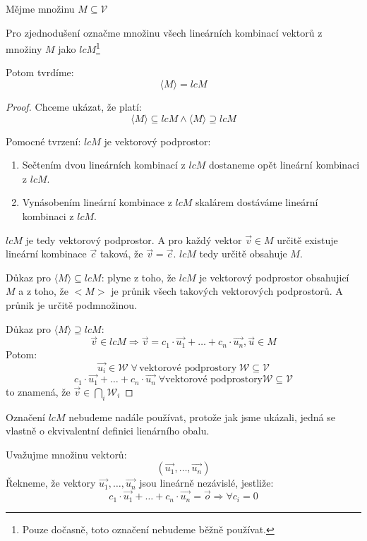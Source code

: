 \begin{theorem}
    Mějme množinu $M \subseteq \mathcal{V}$

    Pro zjednodušení označme množinu všech lineárních kombinací
    vektorů z množiny $M$ jako $lcM$\footnote{Pouze dočasně, toto
    označení nebudeme běžně používat.}

    Potom tvrdíme:
    $$\langle M \rangle = lcM$$
\end{theorem}
\begin{proof}
    Chceme ukázat, že platí:
    $$\langle M \rangle \subseteq lcM \wedge \langle M \rangle \supseteq lcM$$

    Pomocné tvrzení: $lcM$ je vektorový podprostor:
    \begin{enumerate}
        \item Sečtením dvou lineárních kombinací z $lcM$ dostaneme opět lineární kombinaci z $lcM$.
        \item Vynásobením lineární kombinace z $lcM$ skalárem dostáváme lineární kombinaci z $lcM$.
    \end{enumerate}
    $lcM$ je tedy vektorový podprostor. A pro každý vektor $\vec{v} \in M$ určitě existuje
    lineární kombinace $\vec{c}$ taková, že $\vec{v} = \vec{c}$. $lcM$ tedy určitě
    obsahuje $M$.

    Důkaz pro $\langle M \rangle \subseteq lcM$: plyne z toho, že $lcM$ je vektorový
    podprostor obsahujicí $M$ a z toho, že $<M>$ je průnik všech takových vektorových
    podprostorů. A průnik je určitě podmnožinou.

    Důkaz pro $\langle M \rangle \supseteq lcM$:
    $$\vec{v} \in lcM \Rightarrow \vec{v} = c_1
        \cdot \vec{u_1} + \ldots + c_n \cdot \vec{u_n}, \vec{u} \in M$$
    Potom:
    $$\vec{u_i} \in \mathcal{W}\; \forall\,\text{vektorové podprostory}\;
        \mathcal{W} \subseteq \mathcal{V}$$
    $$c_1 \cdot \vec{u_1} + \ldots + c_n \cdot \vec{u_n} \; \forall
    \text{vektorové podprostory} \mathcal{W} \subseteq \mathcal{V}$$
    to znamená, že $\vec{v} \in \bigcap\limits_{i} \mathcal{W}_i$
\end{proof}

Označení $lcM$ nebudeme nadále používat, protože jak jsme ukázali, jedná se vlastně
o ekvivalentní definici lienárního obalu.

\begin{definition}
    \label{def:lin_nezavislost}
    Uvažujme množinu vektorů:
    $$(\vec{u_1}, \ldots, \vec{u_n})$$
    Řekneme, že vektory $\vec{u_1}, \ldots, \vec{u_n}$ jsou lineárně nezávislé,
    jestliže:
    $$c_1\cdot\vec{u_1}+\ldots +c_n\cdot\vec{u_n} = \vec{o} \Rightarrow \forall c_i = 0$$
\end{definition}

